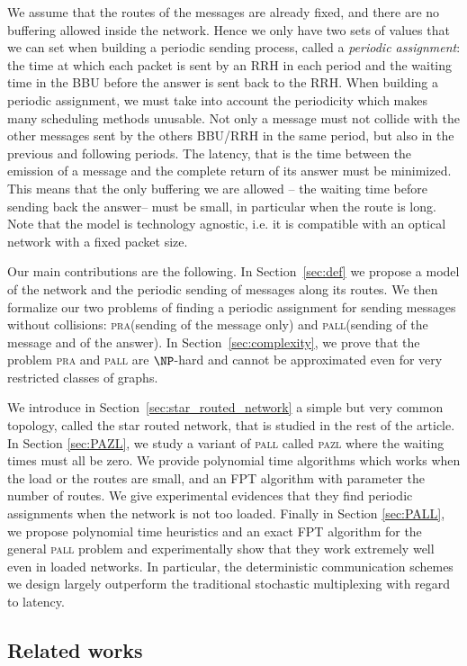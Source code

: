 \documentclass[10pt, conference, letterpaper]{IEEEtran}
\newcommand\pazl{\textsc{pazl}\xspace}
\newcommand\pall{\textsc{pall}\xspace}
\newcommand\pra{\textsc{pra}\xspace}
\begin{document}
We assume that the routes of the messages are already fixed, and there are no buffering allowed inside the network. Hence we only have two sets of values that we can set when building a periodic sending process, called a \emph{periodic assignment}: the time at which each packet is sent by an RRH in each period and the waiting time in the BBU before the answer is sent back to the RRH. When building a periodic assignment, we must take into account the periodicity which makes many scheduling methods unusable. Not only a message must not collide with the other messages sent by the others BBU/RRH in the same period, but also in the previous and following periods. The latency, that is the time between the emission of a message and the complete return of its answer must be minimized. This means that the only buffering we are allowed -- the waiting time before sending back the answer-- must be small, in particular when the route is long. Note that the model is technology agnostic, i.e. it is compatible with an optical network with a fixed packet size.   

Our main contributions are the following.
 In Section~\ref{sec:def} we propose a model of the network and the periodic sending of messages along its routes.
 We then formalize our two problems of finding a periodic assignment for sending messages without collisions: \pra (sending of the message only) and \pall (sending of the message and of the answer).  
In Section~\ref{sec:complexity}, we prove that the problem \pra and \pall are $\NP$-hard and cannot be approximated even for very
restricted classes of graphs. 

We introduce in Section~\ref{sec:star_routed_network} a simple but very common topology, called the star routed network, that is studied in the rest of the article.
In Section \ref{sec:PAZL}, we study a variant of \pall called \pazl  where the waiting times must all be zero. We provide  polynomial time algorithms which works when the load or the routes are small, and an FPT algorithm with parameter the number of routes.
We give experimental evidences that they find periodic assignments when the network is not too loaded. Finally in Section \ref{sec:PALL}, we propose polynomial time heuristics and an exact FPT algorithm for the general \pall problem and experimentally show that they work extremely well even in loaded networks. In particular, the deterministic communication schemes we design largely outperform the traditional stochastic multiplexing with regard to latency. 
 \subsection*{Related works}
\end{document}

